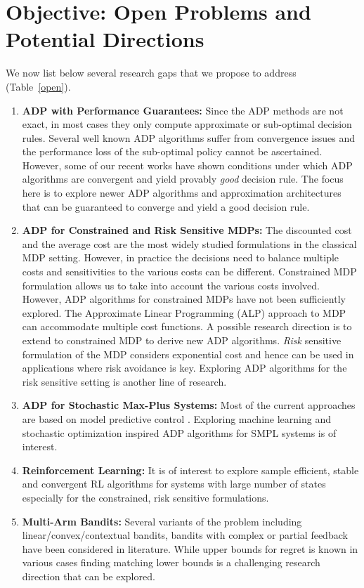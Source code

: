 \section{Objective: Open Problems and Potential Directions}\label{op}
We now list below several research gaps that we propose to address (Table~\ref{open}).
\begin{enumerate}
\item \textbf{ADP with Performance Guarantees:} Since the ADP methods are not exact, in most cases they only compute approximate or sub-optimal decision rules. Several well known ADP algorithms suffer from convergence issues \cite{BertB} and the performance loss of the sub-optimal policy cannot be ascertained. However, some of our recent works \cite{cdcwork,aaaiwork} have shown conditions under which ADP algorithms are convergent and yield provably \emph{good} decision rule. The focus here is to explore newer ADP algorithms and approximation architectures that can be guaranteed to converge and yield a good decision rule.
\item \textbf{ADP for Constrained and Risk Sensitive MDPs:} The discounted cost and the average cost are the most widely studied formulations in the classical MDP setting. However, in practice the decisions need to balance multiple costs and sensitivities to the various costs can be different. Constrained MDP formulation allows us to take into account the various costs involved. However, ADP algorithms for constrained MDPs have not been sufficiently explored. The Approximate Linear Programming (ALP) \cite{alp} approach to MDP can accommodate multiple cost functions. A possible research direction is to extend \cite{aaaiwork} to constrained MDP to derive new ADP algorithms. \emph{Risk} sensitive formulation of the MDP considers exponential cost and hence can be used in applications where risk avoidance is key.  Exploring ADP algorithms for the risk sensitive setting is another line of research.
\item \textbf{ADP for Stochastic Max-Plus Systems:} Most of the current approaches are based on model predictive control \cite{smpl}. Exploring machine learning and stochastic optimization \cite{spsa} inspired ADP algorithms for SMPL systems is of interest.
\item \textbf{Reinforcement Learning:} It is of interest to explore sample efficient, stable and convergent RL algorithms for systems with large number of states especially for the constrained, risk sensitive formulations.
\item \textbf{Multi-Arm Bandits:}  Several variants of the problem including linear/convex/contextual bandits, bandits with complex or partial feedback have been considered in literature. While upper bounds for regret is known in various cases finding matching lower bounds is a challenging research direction that can be explored.
\end{enumerate}
